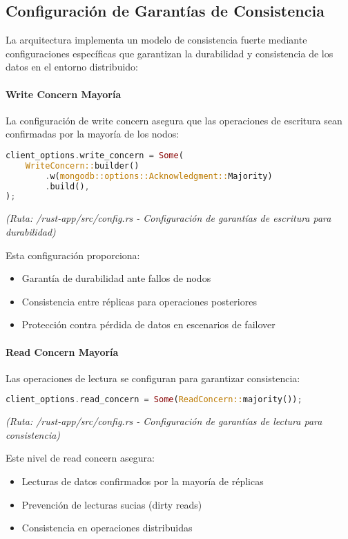 \documentclass[12pt,letterpaper]{article}
\begin{document}
\subsection{Configuración de Garantías de Consistencia}
La arquitectura implementa un modelo de consistencia fuerte mediante configuraciones específicas que garantizan la durabilidad y consistencia de los datos en el entorno distribuido:

\paragraph{Write Concern Mayoría}
La configuración de write concern asegura que las operaciones de escritura sean confirmadas por la mayoría de los nodos:

\begin{lstlisting}[language=rust]
client_options.write_concern = Some(
    WriteConcern::builder()
        .w(mongodb::options::Acknowledgment::Majority)
        .build(),
);
\end{lstlisting}
\textit{(Ruta: /rust-app/src/config.rs - Configuración de garantías de escritura para durabilidad)}

Esta configuración proporciona:
\begin{itemize}
    \item Garantía de durabilidad ante fallos de nodos
    \item Consistencia entre réplicas para operaciones posteriores
    \item Protección contra pérdida de datos en escenarios de failover
\end{itemize}

\paragraph{Read Concern Mayoría}
Las operaciones de lectura se configuran para garantizar consistencia:

\begin{lstlisting}[language=rust]
client_options.read_concern = Some(ReadConcern::majority());
\end{lstlisting}
\textit{(Ruta: /rust-app/src/config.rs - Configuración de garantías de lectura para consistencia)}

Este nivel de read concern asegura:
\begin{itemize}
    \item Lecturas de datos confirmados por la mayoría de réplicas
    \item Prevención de lecturas sucias (dirty reads)
    \item Consistencia en operaciones distribuidas
\end{itemize}
\end{document}
